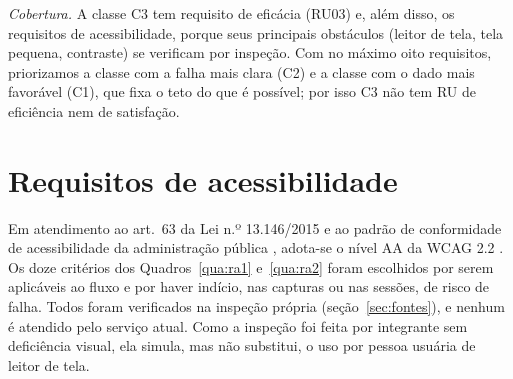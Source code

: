 \documentclass[
  12pt,
  oneside,
  a4paper,
  chapter=TITLE,
  section=TITLE,
  english,
  brazilian
]{abntex2}
\begin{document}
\textit{Cobertura.} A classe C3 tem requisito de eficácia (RU03) e, além disso,
os requisitos de acessibilidade, porque seus principais obstáculos (leitor de
tela, tela pequena, contraste) se verificam por inspeção. Com no máximo oito
requisitos, priorizamos a classe com a falha mais clara (C2) e a classe com o
dado mais favorável (C1), que fixa o teto do que é possível; por isso C3 não tem
RU de eficiência nem de satisfação.

\chapter{Requisitos de acessibilidade}\label{cap:acessibilidade}

Em atendimento ao art.~63 da Lei n.º 13.146/2015 \cite{lbi2015} e ao padrão de conformidade de acessibilidade da administração pública \cite{emag}, adota-se o nível AA da WCAG 2.2 \cite{wcag22}. Os doze critérios dos Quadros~\ref{qua:ra1} e~\ref{qua:ra2} foram escolhidos por serem aplicáveis ao fluxo e por haver indício, nas capturas ou nas sessões, de risco de falha. Todos foram verificados na inspeção própria (seção~\ref{sec:fontes}), e nenhum é atendido pelo serviço atual. Como a inspeção foi feita por integrante sem deficiência visual, ela simula, mas não substitui, o uso por pessoa usuária de leitor de tela.
\end{document}
